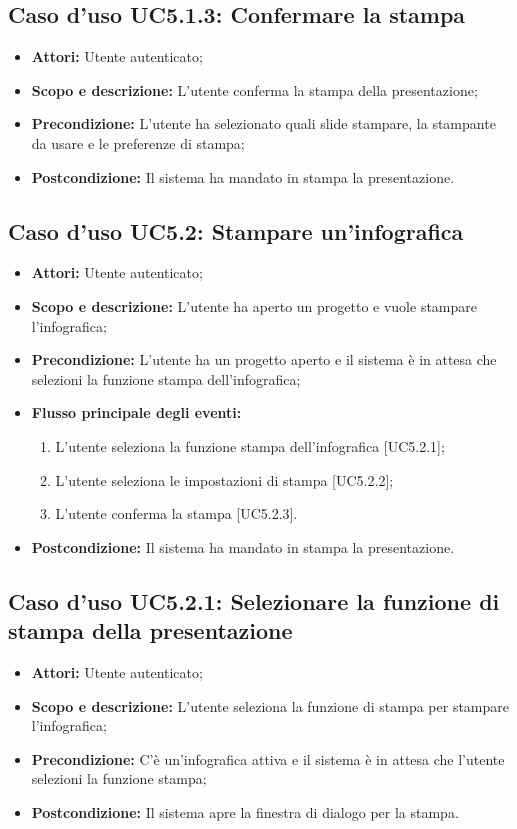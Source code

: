 	\subsection{Caso d'uso UC5.1.3: Confermare la stampa}
	\begin{itemize}
		\item \textbf{Attori:} Utente autenticato;
		\item \textbf{Scopo e descrizione:} L'utente conferma la stampa della presentazione;
		\item \textbf{Precondizione:} L'utente ha selezionato quali slide stampare, la stampante da usare e le preferenze di stampa;
		\item \textbf{Postcondizione:} Il sistema ha mandato in stampa la presentazione.
	\end{itemize}
	
	
	\subsection{Caso d'uso UC5.2: Stampare un'infografica}
	\begin{itemize}
		\item \textbf{Attori:} Utente autenticato;
		\item \textbf{Scopo e descrizione:} L'utente ha aperto un progetto e vuole stampare l'infografica;
		\item \textbf{Precondizione:} L'utente ha un progetto aperto e il sistema è in attesa che selezioni la funzione stampa dell'infografica;
		\item \textbf{Flusso principale degli eventi:}
		\begin{enumerate}
			\item L'utente seleziona la funzione stampa dell'infografica [UC5.2.1];
			\item L'utente seleziona le impostazioni di stampa [UC5.2.2];
			\item L'utente conferma la stampa [UC5.2.3].
		\end{enumerate}
		\item \textbf{Postcondizione:} Il sistema ha mandato in stampa la presentazione.
		\end{itemize}
			
		\subsection{Caso d'uso UC5.2.1: Selezionare la funzione di stampa della presentazione}
		\begin{itemize}
			\item \textbf{Attori:} Utente autenticato;
			\item \textbf{Scopo e descrizione:} L'utente seleziona la funzione di stampa per stampare l'infografica;
			\item \textbf{Precondizione:} C'è un'infografica attiva e il sistema è in attesa che l'utente selezioni la funzione stampa;
			\item \textbf{Postcondizione:} Il sistema apre la finestra di dialogo per la stampa.
		\end{itemize}
		
